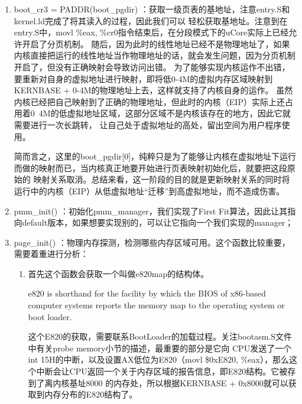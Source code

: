 \documentclass[UTF8, a4paper]{ctexart}
\begin{document}
    \begin{enumerate}
        \item boot\_cr3 = PADDR(boot\_pgdir) ：获取一级页表的基地址，注意entry.S和kernel.ld完成了将其读入的过程，因此我们可以
              轻松获取基地址。注意到在entry.S中，movl \%eax, \%cr0指令结束后，在分段模式下的uCore实际上已经允许开启了分页机制。
              随后，因为此时的线性地址已经不是物理地址了，如果内核直接把运行的线性地址当作物理地址的话，就会发生问题，因为分页机制开启了，但没有正确映射会导致访问出错。
              为了能够实现内核运作不出错，要重新对自身的虚拟地址进行映射，即将低0-4M的虚拟内存区域映射到KERNBASE + 0-4M的物理地址上去，这样就支持了内核自身的运作。
              虽然内核已经把自己映射到了正确的物理地址，但此时的内核（EIP）实际上还占用着0~4M的低虚拟地址区域，这部分区域不是内核该存在的地方，因此它就需要进行一次长跳转，
              让自己处于虚拟地址的高处，留出空间为用户程序使用。
              \par
              简而言之，这里的boot\_pgdir[0]，纯粹只是为了能够让内核在虚拟地址下运行而做的映射而已，当内核真正地要开始进行页表映射初始化后，就要把这段原始的
              映射关系取消。总结来看，这一阶段的目的就是更新映射关系的同时将运行中的内核（EIP）从低虚拟地址“迁移”到高虚拟地址，而不造成伤害。
              
        \item pmm\_init() ：初始化pmm\_manager，我们实现了First Fit算法，因此让其指向default版本，如果想要实现别的，可以让它指向一个我们实现的manager；
        \item page\_init() ：物理内存探测，检测哪些内存区域可用。这个函数比较重要，需要着重进行分析：
            {
                \begin{enumerate}
                    \item 首先这个函数会获取一个叫做e820map的结构体。
                            \par
                            e820 is shorthand for the facility by which the BIOS of x86-based computer systems reports the memory map to the operating system or boot loader.
                            \par
                            这个E820的获取，需要联系BootLoader的加载过程。关注bootasm.S文件中有关probe memory小节的描述，最重要的部分是它向
                            CPU发送了一个int 15H的中断，以及设置AX低位为E820（movl \$0xE820, \%eax），那么这个中断会让CPU返回一个关于内存区域的报告信息，即E820结构。它被存到了离内核基址8000
                            的内存处，所以根据KERNBASE + 0x8000就可以获取到内存分布的E820结构了。
                \end{enumerate}
            }
    \end{enumerate} 
\end{document}
